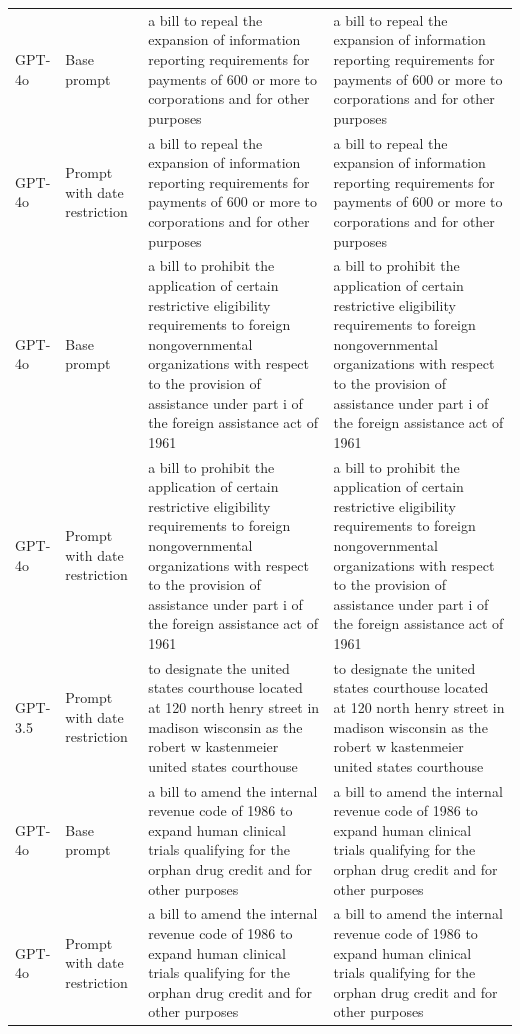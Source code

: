 \begin{longtable}{>{\raggedright\arraybackslash}p{1.4cm}>{\raggedright\arraybackslash}p{1.4cm}>{\raggedright\arraybackslash}p{5.5cm}>{\raggedright\arraybackslash}p{5.5cm}}
GPT-4o & Base prompt & a bill to repeal the expansion of information reporting requirements for payments of 600 or more to corporations and for other purposes & a bill to repeal the expansion of information reporting requirements for payments of 600 or more to corporations and for other purposes\\
GPT-4o & Prompt with date restriction & a bill to repeal the expansion of information reporting requirements for payments of 600 or more to corporations and for other purposes & a bill to repeal the expansion of information reporting requirements for payments of 600 or more to corporations and for other purposes\\
GPT-4o & Base prompt & a bill to prohibit the application of certain restrictive eligibility requirements to foreign nongovernmental organizations with respect to the provision of assistance under part i of the foreign assistance act of 1961 & a bill to prohibit the application of certain restrictive eligibility requirements to foreign nongovernmental organizations with respect to the provision of assistance under part i of the foreign assistance act of 1961\\
GPT-4o & Prompt with date restriction & a bill to prohibit the application of certain restrictive eligibility requirements to foreign nongovernmental organizations with respect to the provision of assistance under part i of the foreign assistance act of 1961 & a bill to prohibit the application of certain restrictive eligibility requirements to foreign nongovernmental organizations with respect to the provision of assistance under part i of the foreign assistance act of 1961\\
GPT-3.5 & Prompt with date restriction & to designate the united states courthouse located at 120 north henry street in madison wisconsin as the robert w kastenmeier united states courthouse & to designate the united states courthouse located at 120 north henry street in madison wisconsin as the robert w kastenmeier united states courthouse\\
GPT-4o & Base prompt & a bill to amend the internal revenue code of 1986 to expand human clinical trials qualifying for the orphan drug credit and for other purposes & a bill to amend the internal revenue code of 1986 to expand human clinical trials qualifying for the orphan drug credit and for other purposes\\
GPT-4o & Prompt with date restriction & a bill to amend the internal revenue code of 1986 to expand human clinical trials qualifying for the orphan drug credit and for other purposes & a bill to amend the internal revenue code of 1986 to expand human clinical trials qualifying for the orphan drug credit and for other purposes\\

\end{longtable}
